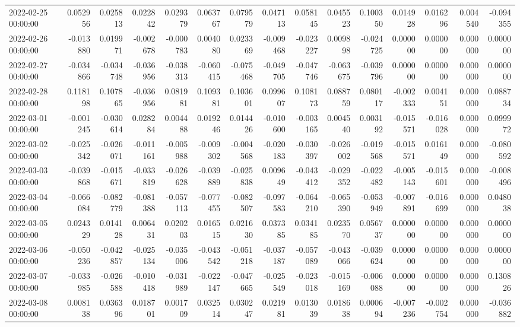\begin{tabular}{lrrrrrrrrrrrrrr}
2022-02-25 00:00:00 & 0.052956 & 0.025813 & 0.022842 & 0.029379 & 0.063767 & 0.079579 & 0.047113 & 0.058145 & 0.045523 & 0.100350 & 0.014928 & 0.016296 & 0.004540 & -0.094355 \\
2022-02-26 00:00:00 & -0.013880 & 0.019971 & -0.002678 & -0.000783 & 0.004080 & 0.023369 & -0.009468 & -0.023227 & 0.009898 & -0.024725 & 0.000000 & 0.000000 & 0.000000 & 0.000000 \\
2022-02-27 00:00:00 & -0.034866 & -0.034748 & -0.036956 & -0.038313 & -0.060415 & -0.075468 & -0.049705 & -0.047746 & -0.063675 & -0.039796 & 0.000000 & 0.000000 & 0.000000 & 0.000000 \\
2022-02-28 00:00:00 & 0.118198 & 0.107865 & -0.036956 & 0.081981 & 0.109381 & 0.103601 & 0.099607 & 0.108173 & 0.088759 & 0.080117 & -0.002333 & 0.004151 & 0.000000 & 0.088734 \\
2022-03-01 00:00:00 & -0.001245 & -0.030614 & 0.028284 & 0.004488 & 0.019246 & 0.014426 & -0.010600 & -0.003165 & 0.004540 & 0.003192 & -0.015571 & -0.016028 & 0.000000 & 0.099972 \\
2022-03-02 00:00:00 & -0.025342 & -0.026071 & -0.011161 & -0.005988 & -0.009302 & -0.004568 & -0.020183 & -0.030397 & -0.026002 & -0.019568 & -0.015571 & 0.016149 & 0.000000 & -0.080592 \\
2022-03-03 00:00:00 & -0.039868 & -0.015671 & -0.033819 & -0.026628 & -0.039889 & -0.025838 & 0.009649 & -0.043412 & -0.029352 & -0.022482 & -0.005143 & -0.015601 & 0.000000 & -0.008496 \\
2022-03-04 00:00:00 & -0.066084 & -0.082779 & -0.081388 & -0.057113 & -0.077455 & -0.082507 & -0.097583 & -0.064210 & -0.065390 & -0.053949 & -0.007891 & -0.016699 & 0.000000 & 0.048038 \\
2022-03-05 00:00:00 & 0.024329 & 0.014128 & 0.006431 & 0.020203 & 0.016515 & 0.021630 & 0.037385 & 0.034185 & 0.023570 & 0.056737 & 0.000000 & 0.000000 & 0.000000 & 0.000000 \\
2022-03-06 00:00:00 & -0.050236 & -0.042857 & -0.025134 & -0.035006 & -0.043542 & -0.051218 & -0.037187 & -0.057089 & -0.043066 & -0.039624 & 0.000000 & 0.000000 & 0.000000 & 0.000000 \\
2022-03-07 00:00:00 & -0.033985 & -0.026588 & -0.010418 & -0.031989 & -0.022147 & -0.047665 & -0.025549 & -0.023018 & -0.015169 & -0.006088 & 0.000000 & 0.000000 & 0.000000 & 0.130826 \\
2022-03-08 00:00:00 & 0.008138 & 0.036396 & 0.018701 & 0.001709 & 0.032514 & 0.030247 & 0.021981 & 0.013039 & 0.018638 & 0.000694 & -0.007236 & -0.002754 & 0.000000 & -0.036882 \\

\end{tabular}
